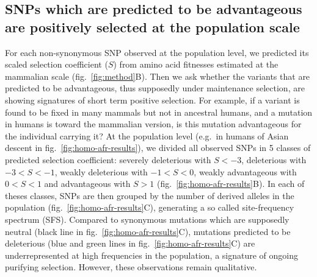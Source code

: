 \documentclass{article}
\newcommand{\Sphy}{S}
\newcommand{\divStrongDel}{\Sphy < -3}
\newcommand{\divDel}{-3 < \Sphy < -1}
\newcommand{\divWeakDel}{-1 < \Sphy < 0}
\newcommand{\divWeakAdv}{0 < \Sphy < 1}
\newcommand{\divAdv}{ \Sphy > 1}
\begin{document}
    \subsection*{SNPs which are predicted to be advantageous are positively selected at the population scale}

    For each non-synonymous SNP observed at the population level, we predicted its scaled selection coefficient ($\Sphy$) from amino acid fitnesses estimated at the mammalian scale (fig.~\ref{fig:method}B).
    Then we ask whether the variants that are predicted to be advantageous, thus supposedly under maintenance selection, are showing signatures of short term positive selection.
    For example, if a variant is found to be fixed in many mammals but not in ancestral humans, and a mutation in humans is toward the mammalian version, is this mutation advantageous for the individual carrying it?
    At the population level (e.g.~in humans of Asian descent in fig.~\ref{fig:homo-afr-results}), we divided all observed SNPs in 5 classes of predicted selection coefficient: severely deleterious with $\divStrongDel$, deleterious with $\divDel$, weakly deleterious with $\divWeakDel$, weakly advantageous with $\divWeakAdv$ and advantageous with $\divAdv$ (fig.~\ref{fig:homo-afr-results}B).
    In each of theses classes, SNPs are then grouped by the number of derived alleles in the population (fig.~\ref{fig:homo-afr-results}C), generating a so called site-frequency spectrum (SFS).
    Compared to synonymous mutations which are supposedly neutral (black line in fig.~\ref{fig:homo-afr-results}C), mutations predicted to be deleterious (blue and green lines in fig.~\ref{fig:homo-afr-results}C) are underrepresented at high frequencies in the population, a signature of ongoing purifying selection.
    However, these observations remain qualitative.
\end{document}
